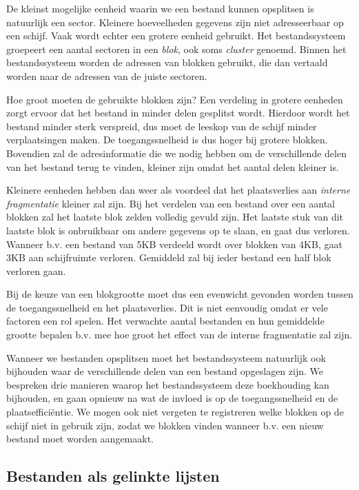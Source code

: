De kleinst mogelijke eenheid waarin we een bestand kunnen
opsplitsen is natuurlijk een sector. Kleinere hoeveelheden gegevens
zijn niet adresseerbaar op een schijf. Vaak wordt echter een grotere
eenheid gebruikt. Het bestandssysteem groepeert een aantal sectoren in
een \emph{blok}, ook soms
\emph{cluster} genoemd. Binnen het bestandssysteem
worden de adressen van blokken gebruikt, die dan vertaald worden naar
de adressen van de juiste sectoren.

Hoe groot moeten de gebruikte blokken zijn? Een verdeling in
grotere eenheden zorgt ervoor dat het bestand in minder delen
gesplitst wordt. Hierdoor wordt het bestand minder sterk verspreid,
dus moet de leeskop van de schijf minder verplaatsingen maken. De
toegangssnelheid is dus hoger bij grotere blokken. Bovendien zal de
adresinformatie die we nodig hebben om de verschillende delen van het
bestand terug te vinden, kleiner zijn omdat het aantal delen kleiner
is.

Kleinere eenheden hebben dan weer als voordeel dat het
plaatsverlies aan \emph{interne fragmentatie} kleiner
zal zijn. Bij het verdelen van een bestand over een aantal blokken zal
het laatste blok zelden volledig gevuld zijn. Het laatste stuk van dit
laatste blok is onbruikbaar om andere gegevens op te slaan, en gaat
dus verloren. Wanneer b.v. een bestand van 5KB verdeeld wordt over
blokken van 4KB, gaat 3KB aan schijfruimte verloren. Gemiddeld zal bij
ieder bestand een half blok verloren gaan.

Bij de keuze van een blokgrootte moet dus een evenwicht gevonden
worden tussen de toegangssnelheid en het plaatsverlies. Dit is niet
eenvoudig omdat er vele factoren een rol spelen. Het verwachte aantal
bestanden en hun gemiddelde grootte bepalen b.v. mee hoe groot het
effect van de interne fragmentatie zal zijn.

Wanneer we bestanden opsplitsen moet het bestandssysteem
natuurlijk ook bijhouden waar de verschillende delen van een bestand
opgeslagen zijn. We bespreken drie manieren waarop het bestandssysteem
deze boekhouding kan bijhouden, en gaan opnieuw na wat de invloed is
op de toegangssnelheid en de plaatseffici\"entie. We mogen ook niet
vergeten te registreren welke blokken op de schijf niet in gebruik
zijn, zodat we blokken vinden wanneer b.v. een nieuw bestand moet
worden aangemaakt.

\subsection{Bestanden als gelinkte lijsten}

